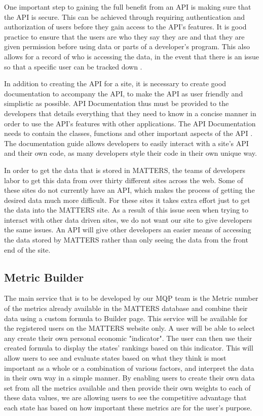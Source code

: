 		One important step to gaining the full benefit from an API is making 
		sure that the API is secure. This can be achieved through requiring 
		authentication and authorization of users before they gain access to the
		API's features. It is good practice to ensure that the users are who 
		they say they are and that they are given permission before using data 
		or parts of a developer's program. This also allows for a record of who 
		is accessing the data, in the event that there is an issue so that a 
		specific user can be tracked down \cite{jisc}.

		In addition to creating the API for a site, it is necessary to create 
		good documentation to accompany the API, to make the API as user 
		friendly and simplistic as possible. API Documentation thus must be 
		provided to the developers that details everything that they need to 
		know in a concise manner in order to use the API’s features with other 
		applications. The API Documentation needs to contain the classes, 
		functions and other important aspects of the API \cite{cio}. The 
		documentation guide allows developers to easily interact with a site's 
		API and their own code, as many developers style their code in their own 
		unique way. 
		
		In order to get the data that is stored in MATTERS, the teams of developers labor to get this data from over thirty different sites across the web. Some of these sites do not currently have an API, which makes the process of getting the desired data much more difficult. For these sites it takes extra effort just to get the data into the MATTERS site. As a result of this issue seen when trying to interact with other data driven sites, we do not want our site to give developers the same issues. An API will give other developers an easier means of accessing the data stored by MATTERS rather than only seeing the data from the front end of the site.

	\subsection{Metric Builder}

		The main service that is to be developed by our MQP team is the Metric 
		number of the metrics already available in the MATTERS database and 
		combine their data using a custom formula to Builder page. This service 
		will be available for the registered users on the MATTERS website only. 
		A user will be able to select any create their own personal economic 
		"indicator". The user can then use their created formula to display the 
		states' rankings based on this indicator. This will allow users to see 
		and evaluate states based on what they think is most important as a 
		whole or a combination of various factors, and interpret the data in 
		their own way in a simple manner. By enabling users to create their own 
		data set from all the metrics available and then provide their own 
		weights to each of these data values, we are allowing users to see the 
		competitive advantage that each state has based on how important these 
		metrics are for the user's purpose.


